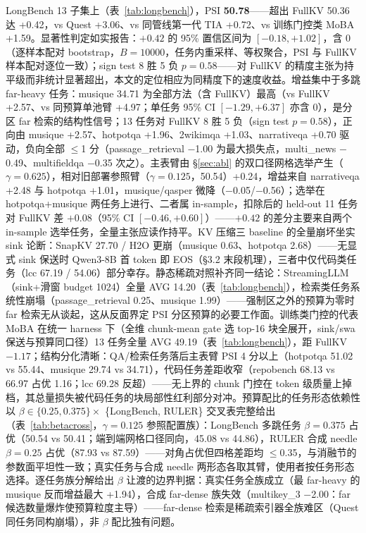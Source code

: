 \documentclass[11pt]{article}
\begin{document}
LongBench 13 子集上（表~\ref{tab:longbench}），PSI \textbf{50.78}——超出 FullKV 50.36 达 +0.42，vs Quest +3.06、vs 同管线第一代 TIA +0.72、vs 训练门控类 MoBA +1.59。显著性判定如实报告：$+0.42$ 的 95\% 置信区间为 $[-0.18, +1.02]$，含 0（逐样本配对 bootstrap，$B{=}10000$，任务内重采样、等权聚合，PSI 与 FullKV 样本配对逐位一致）；sign test 8 胜 5 负 $p{=}0.58$——对 FullKV 的精度主张为持平级而非统计显著超出，本文的定位相应为同精度下的速度收益。增益集中于多跳 far-heavy 任务：musique 34.71 为全部方法（含 FullKV）最高（vs FullKV +2.57、vs 同预算单池臂 +4.97；单任务 95\% CI $[-1.29, +6.37]$ 亦含 0），是分区 far 检索的结构性信号；13 任务对 FullKV 8 胜 5 负（sign test $p{=}0.58$），正向由 musique +2.57、hotpotqa +1.96、2wikimqa +1.03、narrativeqa +0.70 驱动，负向全部 $\leq$1 分（passage\_retrieval $-$1.00 为最大损失点，multi\_news $-$0.49、multifieldqa $-$0.35 次之）。主表臂由 \S\ref{sec:abl} 的双口径网格选举产生（$\gamma{=}0.625$），相对旧部署参照臂（$\gamma{=}0.125$，50.54）+0.24，增益来自 narrativeqa +2.48 与 hotpotqa +1.01，musique/qasper 微降（$-$0.05/$-$0.56）；选举在 hotpotqa+musique 两任务上进行、二者属 in-sample，扣除后的 held-out 11 任务对 FullKV 差 $+0.08$（95\% CI $[-0.46, +0.60]$）——$+0.42$ 的差分主要来自两个 in-sample 选举任务，全量主张应读作持平。KV 压缩三 baseline 的全量崩坏坐实 sink 论断：SnapKV 27.70 / H2O 更崩（musique 0.63、hotpotqa 2.68）——无显式 sink 保送时 Qwen3-8B 首 token 即 EOS（§3.2 末段机理），三者中仅代码类任务（lcc 67.19 / 54.06）部分幸存。静态稀疏对照补齐同一结论：StreamingLLM（sink+滑窗 budget 1024）全量 AVG 14.20（表~\ref{tab:longbench}），检索类任务系统性崩塌（passage\_retrieval 0.25、musique 1.99）——强制区之外的预算为零时 far 检索无从谈起，这从反面界定 PSI 分区预算的必要工作面。训练类门控的代表 MoBA 在统一 harness 下（全维 chunk-mean gate 选 top-16 块全展开，sink/swa 保送与预算同口径）13 任务全量 AVG 49.19（表~\ref{tab:longbench}），距 FullKV $-1.17$；结构分化清晰：QA/检索任务落后主表臂 PSI 4 分以上（hotpotqa 51.02 vs 55.44、musique 29.74 vs 34.71），代码任务差距收窄（repobench 68.13 vs 66.97 占优 1.16；lcc 69.28 反超）——无上界的 chunk 门控在 token 级质量上掉档，其总量损失被代码任务的块局部性红利部分对冲。预算配比的任务形态依赖性以 $\beta \in \{0.25, 0.375\} \times$ \{LongBench, RULER\} 交叉表完整给出（表~\ref{tab:betacross}，$\gamma{=}0.125$ 参照配置族）：LongBench 多跳任务 $\beta{=}0.375$ 占优（50.54 vs 50.41；端到端网格口径同向，45.08 vs 44.86），RULER 合成 needle $\beta{=}0.25$ 占优（87.93 vs 87.59）——对角占优但四格差距均 $\le$0.35，与消融节的参数面平坦性一致；真实任务与合成 needle 两形态各取其臂，使用者按任务形态选择。逐任务族分解给出 $\beta$ 让渡的边界判据：真实任务全族成立（最 far-heavy 的 musique 反而增益最大 +1.94），合成 far-dense 族失效（multikey\_3 $-$2.00：far 候选数量爆炸使预算粒度主导）——far-dense 检索是稀疏索引器全族难区（Quest 同任务同构崩塌），非 $\beta$ 配比独有问题。
\end{document}
